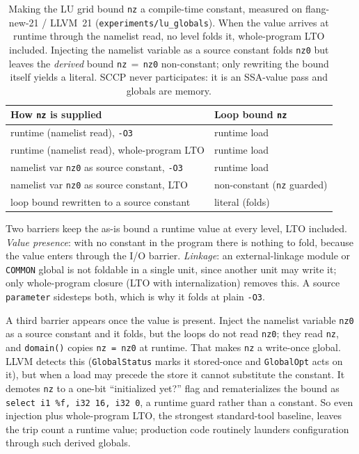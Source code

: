 \begin{table}[t]
  \centering
  \caption{Making the LU grid bound \texttt{nz} a compile-time constant, measured on flang-new-21 / LLVM~21 (\texttt{experiments/lu\_globals}). When the value arrives at runtime through the namelist read, no level folds it, whole-program LTO included. Injecting the namelist variable as a source constant folds \texttt{nz0} but leaves the \emph{derived} bound \texttt{nz}\,$=$\,\texttt{nz0} non-constant; only rewriting the bound itself yields a literal. SCCP never participates: it is an SSA-value pass and globals are memory.}
  \label{tab:lu}
  \small
  \setlength{\tabcolsep}{4pt}
  \begin{tabular}{@{}p{5.7cm}l@{}}
    \toprule
    How \texttt{nz} is supplied & Loop bound \texttt{nz} \\
    \midrule
    runtime (namelist read), \texttt{-O3}               & runtime load \\
    runtime (namelist read), whole-program LTO          & runtime load \\
    namelist var \texttt{nz0} as source constant, \texttt{-O3} & runtime load \\
    namelist var \texttt{nz0} as source constant, LTO   & non-constant (\texttt{nz} guarded) \\
    loop bound rewritten to a source constant           & literal (folds) \\
    \bottomrule
  \end{tabular}
\end{table}

Two barriers keep the as-is bound a runtime value at every level, LTO included. \emph{Value presence}: with no constant in the program there is nothing to fold, because the value enters through the I/O barrier. \emph{Linkage}: an external-linkage module or \texttt{COMMON} global is not foldable in a single unit, since another unit may write it; only whole-program closure (LTO with internalization) removes this. A source \texttt{parameter} sidesteps both, which is why it folds at plain \texttt{-O3}.

A third barrier appears once the value is present. Inject the namelist variable \texttt{nz0} as a source constant and it folds, but the loops do not read \texttt{nz0}; they read \texttt{nz}, and \lstinline[style=fortran]|domain()| copies \texttt{nz = nz0} at runtime. That makes \texttt{nz} a write-once global. LLVM detects this (\texttt{GlobalStatus} marks it stored-once and \texttt{GlobalOpt} acts on it), but when a load may precede the store it cannot substitute the constant. It demotes \texttt{nz} to a one-bit ``initialized yet?'' flag and rematerializes the bound as \texttt{select i1 \%f, i32 16, i32 0}, a runtime guard rather than a constant. So even injection plus whole-program LTO, the strongest standard-tool baseline, leaves the trip count a runtime value; production code routinely launders configuration through such derived globals.


